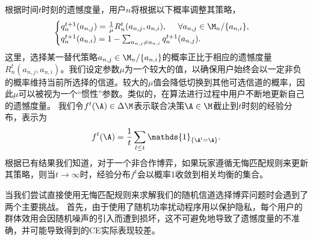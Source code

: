 根据时间$t$时刻的遗憾度量，用户$n$将根据以下概率调整其策略，
\vspace{-0.3cm}
\begin{equation}\label{eq:st1}
\begin{cases}
q^{t+1}_n(a_{n,j})=\frac{1}{\mu}R^t_n(a_{n,j},a_{n,i}), ~~~~\forall a_{n,j}\in\M_n/\{a_{n,i}\}, \\
q^{t+1}_n(a_{n,i})=1-\sum_{a_{n,j}\neq a_{n,i}}q^{t+1}_n(a_{n,j}).
\end{cases}
\end{equation}
这里，选择某一替代策略$a_{n,j}\in\M_n/\{a_{n,i}\}$的概率正比于相应的遗憾度量$R^{t}_n(a_{n,j},a_{n,i})$。我们设定参数$\mu$为一个较大的值，以确保用户始终会以一定非负的概率维持当前所选择的信道。较大的$\mu$值会降低切换到其他可选信道的概率，因此$\mu$可以被视为一个“惯性”参数。类似的，在算法进行过程中用户不断地更新自己的遗憾度量。
我们令$f^t(\A)\in\Delta\M$表示联合决策$\A\in\M$截止到$t$时刻的经验分布，表示为
\vspace{-0.2cm}
\begin{equation}\label{eq:empi}
f^t(\A)=\frac{1}{t}\sum_{l\leq t}\mathds{1}_{\{\A^l=\A\}}.
\end{equation}
根据已有结果我们知道，对于一个非合作博弈，如果玩家遵循无悔匹配规则来更新其策略，则当$t\rightarrow\infty$时，经验分布$f^t$会以概率1收敛到相关均衡的集合\cite{Hart00asimple}。

当我们尝试直接使用无悔匹配规则来求解我们的随机信道选择博弈问题时会遇到了两个主要挑战。
首先，由于使用了随机功率扰动程序用以保护隐私，每个用户的群体效用会因随机噪声的引入而遭到损坏，这不可避免地导致了遗憾度量的不准确，并可能导致得到的CE实际表现较差。

